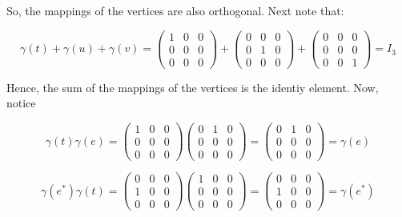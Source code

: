 \begin{solution}
    So, the mappings of the vertices are also orthogonal. Next note that:

    $$\gamma(t)+\gamma(u)+\gamma(v)=\left(\begin{array}{ccc} 1 & 0 & 0 \\ 0 & 0 & 0 \\ 0 & 0 & 0 \end{array}\right)
    +\left(\begin{array}{ccc} 0 & 0 & 0 \\ 0 & 1 & 0 \\ 0 & 0 & 0 \end{array}\right)
    +\left(\begin{array}{ccc} 0 & 0 & 0 \\ 0 & 0 & 0 \\ 0 & 0 & 1 \end{array}\right)=I_3$$

    Hence, the sum of the mappings of the vertices is the identiy element. Now, notice

    $$\gamma(t)\gamma(e)=\left(\begin{array}{ccc} 1 & 0 & 0 \\ 0 & 0 & 0 \\ 0 & 0 & 0 \end{array}\right)
    \left(\begin{array}{ccc} 0 & 1 & 0 \\ 0 & 0 & 0 \\ 0 & 0 & 0 \end{array}\right)
    =\left(\begin{array}{ccc} 0 & 1 & 0 \\ 0 & 0 & 0 \\ 0 & 0 & 0 \end{array}\right)=\gamma(e)$$

    $$\gamma(e^*)\gamma(t)=\left(\begin{array}{ccc} 0 & 0 & 0 \\ 1 & 0 & 0 \\ 0 & 0 & 0 \end{array}\right)
    \left(\begin{array}{ccc} 1 & 0 & 0 \\ 0 & 0 & 0 \\ 0 & 0 & 0 \end{array}\right)
    =\left(\begin{array}{ccc} 0 & 0 & 0 \\ 1 & 0 & 0 \\ 0 & 0 & 0 \end{array}\right)=\gamma(e^*)$$


\end{solution}
